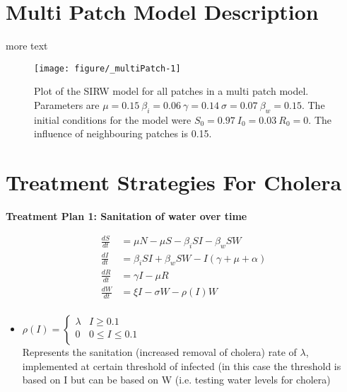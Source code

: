\documentclass[12pt]{article}\usepackage[]{graphicx}\usepackage[]{color}
\makeatletter
\def\maxwidth{ %
  \ifdim\Gin@nat@width>\linewidth
    \linewidth
  \else
    \Gin@nat@width
  \fi
}
\newenvironment{knitrout}{}{} %
\makeatother
\begin{document}
\section{Multi Patch Model Description}

more text


\begin{knitrout}
\color{fgcolor}\begin{figure}
\texttt{[image: figure/\_multiPatch-1]} \caption{\label{fig:multipatch} Plot of the SIRW model for all patches in a multi patch model. Parameters are $\mu=0.15\ \beta_i=0.06\ \gamma=0.14\ \sigma=0.07\ \beta_w=0.15$. The initial conditions for the model were $S_0=0.97\ I_0=0.03\ R_0=0$. The influence of neighbouring patches is 0.15.}\label{fig:<multiPatch}
\end{figure}


\end{knitrout}
\FloatBarrier
\section{Treatment Strategies For Cholera}

\textbf{Treatment Plan 1: Sanitation of water over time}

\begin{align*}
	\frac{dS}{dt}&= \mu N - \mu S - \beta_i SI - \beta_w S W  \\
	\frac{dI}{dt}&= \beta_i S I + \beta_w S W - I (\gamma + \mu + \alpha) \\
	\frac{dR}{dt}&= \gamma I - \mu R \\
	\frac{dW}{dt}&= \xi I  - \sigma W - \rho (I) W\\
\end{align*}

\begin{itemize}
	\item $\rho (I)= \begin{cases}
			 			\lambda & I \geq 0.1 \\
			 			0 & 0 \leq I \leq 0.1 \\
			 			\end{cases}$\\
	Represents the sanitation (increased removal of cholera) rate of $\lambda$, implemented at certain threshold of infected (in this case the threshold is based on I but can be based on W (i.e. testing water levels for cholera) %
\end{itemize}
\end{document}
